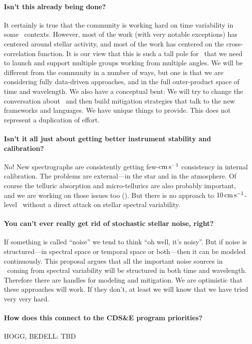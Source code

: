 \documentclass[12pt, letterpaper]{article}
\begin{document}
\paragraph{Isn't this already being done?}
It certainly is true that the community is working hard on time
variability in some \EPRV\ contexts.
However, most of the work (with very notable exceptions) has centered
around stellar activity, and most of the work has centered on the
cross-correlation function.
It is our view that this is such a tall pole for \EPRV\ that we need
to launch and support multiple groups working from multiple angles.
We will be different from the community in a number of ways, but one
is that we are considering fully data-driven approaches, and in the
full outer-product space of time and wavelength.
We also have a conceptual bent: We will try to change the conversation
about \EPRV\ and then build mitigation strategies that talk to the
new frameworks and languages.
We have unique things to provide.
This does not represent a duplication of effort.

\paragraph{Isn't it all just about getting better instrument stability and calibration?}
No! New spectrographs are consistently getting few-${\mathrm{cm\,s^{-1}}}$ consistency
in internal calibration.
The problems are external---in the star and in the atmosphere.
Of course the telluric absorption and micro-tellurics are also
probably important, and we are working on those issues too (\citealt{Bedell2019}).
But there is no approach to $10\,{\mathrm{cm\,s^{-1}}}$-level \EPRV\ without a direct
attack on stellar spectral variability.

\paragraph{You can't ever really get rid of stochastic stellar noise, right?}
If something is called ``noise'' we tend to think ``oh well, it's
noisy''. But if noise is structured---in spectral space or temporal
space or both---then it can be modeled continuously.
This proposal argues that all the important noise sources in \EPRV\ coming
from spectral variability will be structured in both time and wavelength.
Therefore there are handles for modeling and mitigation.
We are optimistic that these approaches will work.
If they don't, at least we will know that we have tried very very hard.

\paragraph{How does this connect to the CDS\&E program priorities?}
HOGG, BEDELL: TBD

\clearpage

\raggedright
\end{document}
